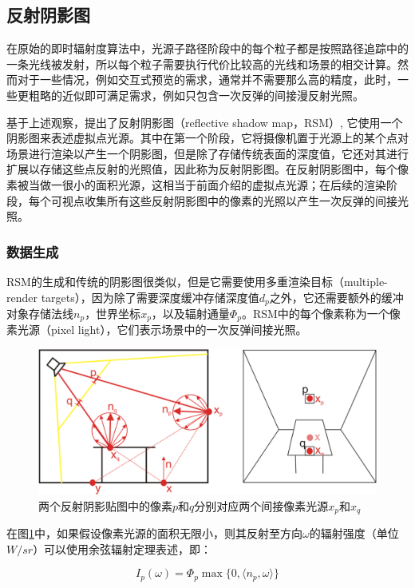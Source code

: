 \subsection{反射阴影图}\label{sec:ir-RSM}
在原始的即时辐射度算法中，光源子路径阶段中的每个粒子都是按照路径追踪中的一条光线被发射，所以每个粒子需要执行代价比较高的光线和场景的相交计算。然而对于一些情况，例如交互式预览的需求，通常并不需要那么高的精度，此时，一些更粗略的近似即可满足需求，例如只包含一次反弹的间接漫反射光照。

基于上述观察，\cite{a:ReflectiveShadowMaps}提出了反射阴影图（reflective shadow map，RSM）, 它使用一个阴影图来表述虚拟点光源。其中在第一个阶段，它将摄像机置于光源上的某个点对场景进行渲染以产生一个阴影图，但是除了存储传统表面的深度值，它还对其进行扩展以存储这些点反射的光照值，因此称为反射阴影图。在反射阴影图中，每个像素被当做一很小的面积光源，这相当于前面介绍的虚拟点光源；在后续的渲染阶段，每个可视点收集所有这些反射阴影图中的像素的光照以产生一次反弹的间接光照。




\subsubsection{数据生成}
RSM的生成和传统的阴影图很类似，但是它需要使用多重渲染目标（multiple-render targets），因为除了需要深度缓冲存储深度值$d_p$之外，它还需要额外的缓冲对象存储法线$n_p$，世界坐标$x_p$，以及辐射通量$\Phi_p$。RSM中的每个像素称为一个像素光源（pixel light），它们表示场景中的一次反弹间接光照。

\begin{figure}
\sidecaption
	\includegraphics[width=.65\textwidth]{figures/ir/ir-2-1}	
	\caption{两个反射阴影贴图中的像素$p$和$q$分别对应两个间接像素光源$x_p$和$x_q$}
	\label{f:ir-rsm}
\end{figure}

在图\ref{f:ir-rsm}中，如果假设像素光源的面积无限小，则其反射至方向$\omega$的辐射强度（单位$W/sr$）可以使用余弦辐射定理表述，即：

\begin{equation}\label{e:ir-diffuse-radiant-intensity}
	I_p(\omega)=\Phi_p \max\{ 0,\langle n_p,\omega \rangle \}
\end{equation}

